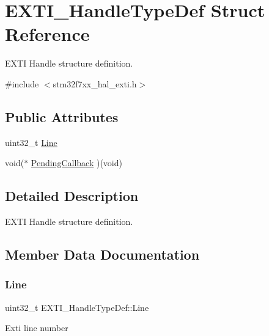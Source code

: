 \hypertarget{struct_e_x_t_i___handle_type_def}{}\section{E\+X\+T\+I\+\_\+\+Handle\+Type\+Def Struct Reference}
\label{struct_e_x_t_i___handle_type_def}


E\+X\+TI Handle structure definition.  




{\ttfamily \#include $<$stm32f7xx\+\_\+hal\+\_\+exti.\+h$>$}

\subsection*{Public Attributes}
\begin{DoxyCompactItemize}
\item 
uint32\+\_\+t \mbox{\hyperlink{struct_e_x_t_i___handle_type_def_a6a2875051ad4276be5322ffa99e12566}{Line}}
\item 
void($\ast$ \mbox{\hyperlink{struct_e_x_t_i___handle_type_def_a854aa31dcf03aab7089851afae6da8d3}{Pending\+Callback}} )(void)
\end{DoxyCompactItemize}


\subsection{Detailed Description}
E\+X\+TI Handle structure definition. 

\subsection{Member Data Documentation}
\mbox{\label{struct_e_x_t_i___handle_type_def_a6a2875051ad4276be5322ffa99e12566}} 
\subsubsection{\texorpdfstring{Line}{Line}}
{\footnotesize\ttfamily uint32\+\_\+t E\+X\+T\+I\+\_\+\+Handle\+Type\+Def\+::\+Line}

Exti line number \mbox{\label{struct_e_x_t_i___handle_type_def_a854aa31dcf03aab7089851afae6da8d3}} 
